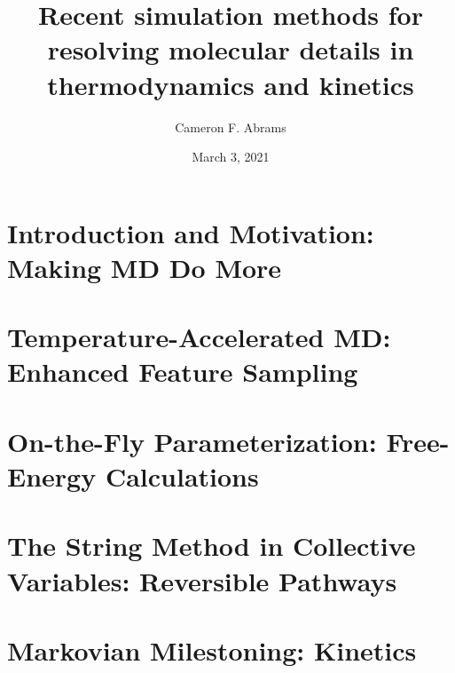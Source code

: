 \documentclass[10pt]{beamer}
\title{Recent simulation methods for resolving molecular details in thermodynamics and kinetics}
\date{March 3, 2021}
\author{Cameron F. Abrams}
\institute{Drexel University, Department of Chemical and Biological Engineering}
\begin{document}
\maketitle





\section{Introduction and Motivation:  Making MD Do More}







\section{Temperature-Accelerated MD: Enhanced Feature Sampling}





\section{On-the-Fly Parameterization:  Free-Energy Calculations}













%

\section{The String Method in Collective Variables: Reversible Pathways}











\section{Markovian Milestoning:  Kinetics}
\end{document}
